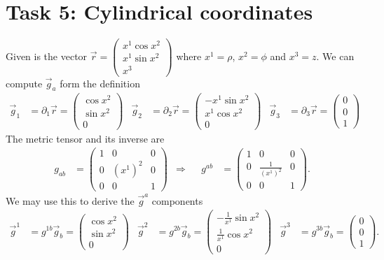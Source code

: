\documentclass[english, parskip=full]{scrartcl}
\begin{document}
\section*{Task 5: Cylindrical coordinates}
Given is the vector $\vec{r}=\begin{pmatrix}
x^1\cos x^2 \\ x^1\sin x^2 \\ x^3
\end{pmatrix}$ where $x^1=\rho$, $x^2=\phi$ and $x^3=z$.
We can compute $\vec{g}_a$ form the definition
\begin{align}
\vec{g}_1 &= \partial_1\vec{r} = \begin{pmatrix}
\cos x^2 \\ \sin x^2 \\ 0
\end{pmatrix} &\vec{g}_2 &= \partial_2\vec{r} = \begin{pmatrix}
-x^1\sin x^2 \\ x^1\cos x^2 \\ 0
\end{pmatrix}&\vec{g}_3 &= \partial_3\vec{r}=\begin{pmatrix}
0 \\ 0 \\ 1
\end{pmatrix} \label{eqn:zylinder:g unten a}
\end{align}
The metric tensor and its inverse are
\begin{align}
g_{ab} &= \begin{pmatrix}
1&0&0 \\ 0&(x^1)^2&0 \\ 0&0&1
\end{pmatrix} &\Rightarrow&& g^{ab} &= \begin{pmatrix}
1&0&0 \\ 0&\frac{1}{(x^1)^2}&0 \\ 0&0&1
\end{pmatrix}. \label{eqn:zylinder:Metrik}
\end{align}
We may use this to derive the $\vec{g}^a$ components
\begin{align}
\vec{g}^1 &= g^{1b}\vec{g}_b = \begin{pmatrix}
\cos x^2 \\ \sin x^2 \\ 0
\end{pmatrix} &\vec{g}^2 &= g^{2b}\vec{g}_b = \begin{pmatrix}
-\frac{1}{x^1}\sin x^2 \\ \frac{1}{x^1}\cos x^2 \\ 0
\end{pmatrix} &\vec{g}^3 &= g^{3b}\vec{g}_b = \begin{pmatrix}
0 \\ 0 \\ 1
\end{pmatrix}. \label{eqn:zylinder:g oben a}
\end{align}
\end{document}
